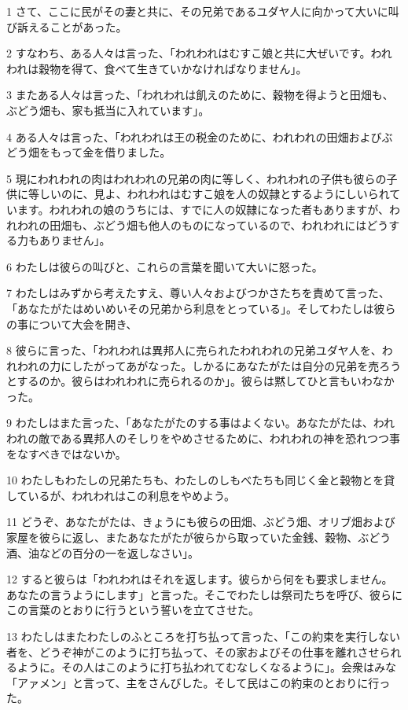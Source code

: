 \par 1 さて、ここに民がその妻と共に、その兄弟であるユダヤ人に向かって大いに叫び訴えることがあった。
\par 2 すなわち、ある人々は言った、「われわれはむすこ娘と共に大ぜいです。われわれは穀物を得て、食べて生きていかなければなりません」。
\par 3 またある人々は言った、「われわれは飢えのために、穀物を得ようと田畑も、ぶどう畑も、家も抵当に入れています」。
\par 4 ある人々は言った、「われわれは王の税金のために、われわれの田畑およびぶどう畑をもって金を借りました。
\par 5 現にわれわれの肉はわれわれの兄弟の肉に等しく、われわれの子供も彼らの子供に等しいのに、見よ、われわれはむすこ娘を人の奴隷とするようにしいられています。われわれの娘のうちには、すでに人の奴隷になった者もありますが、われわれの田畑も、ぶどう畑も他人のものになっているので、われわれにはどうする力もありません」。
\par 6 わたしは彼らの叫びと、これらの言葉を聞いて大いに怒った。
\par 7 わたしはみずから考えたすえ、尊い人々およびつかさたちを責めて言った、「あなたがたはめいめいその兄弟から利息をとっている」。そしてわたしは彼らの事について大会を開き、
\par 8 彼らに言った、「われわれは異邦人に売られたわれわれの兄弟ユダヤ人を、われわれの力にしたがってあがなった。しかるにあなたがたは自分の兄弟を売ろうとするのか。彼らはわれわれに売られるのか」。彼らは黙してひと言もいわなかった。
\par 9 わたしはまた言った、「あなたがたのする事はよくない。あなたがたは、われわれの敵である異邦人のそしりをやめさせるために、われわれの神を恐れつつ事をなすべきではないか。
\par 10 わたしもわたしの兄弟たちも、わたしのしもべたちも同じく金と穀物とを貸しているが、われわれはこの利息をやめよう。
\par 11 どうぞ、あなたがたは、きょうにも彼らの田畑、ぶどう畑、オリブ畑および家屋を彼らに返し、またあなたがたが彼らから取っていた金銭、穀物、ぶどう酒、油などの百分の一を返しなさい」。
\par 12 すると彼らは「われわれはそれを返します。彼らから何をも要求しません。あなたの言うようにします」と言った。そこでわたしは祭司たちを呼び、彼らにこの言葉のとおりに行うという誓いを立てさせた。
\par 13 わたしはまたわたしのふところを打ち払って言った、「この約束を実行しない者を、どうぞ神がこのように打ち払って、その家およびその仕事を離れさせられるように。その人はこのように打ち払われてむなしくなるように」。会衆はみな「アァメン」と言って、主をさんびした。そして民はこの約束のとおりに行った。
